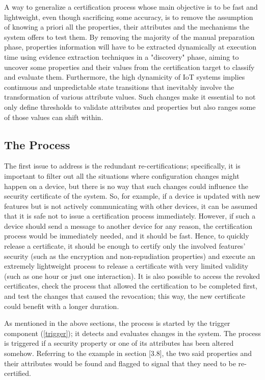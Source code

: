 A way to generalize a certification process whose main objective is to be fast and lightweight, even though sacrificing some accuracy, is to remove the assumption of knowing a priori all the properties, their attributes and the mechanisms the system offers to test them. By removing the majority of the manual preparation phase, properties information will have to be extracted dynamically at execution time using evidence extraction techniques in a "discovery" phase, aiming to uncover some properties and their values from the certification target to classify and evaluate them. Furthermore, the high dynamicity of IoT systems implies continuous and unpredictable state transitions that inevitably involve the transformation of various attribute values. Such changes make it essential to not only define thresholds to validate attributes and properties but also ranges some of those values can shift within.

\subsection{The Process}
The first issue to address is the redundant re-certifications; specifically, it is important to filter out all the situations where configuration changes might happen on a device, but there is no way that such changes could influence the security certificate of the system. So, for example, if a device is updated with new features but is not actively communicating with other devices, it can be assumed that it is safe not to issue a certification process immediately. However, if such a device should send a message to another device for any reason, the certification process would be immediately needed, and it should be fast. Hence, to quickly release a certificate, it should be enough to certify only the involved features' security (such as the encryption and non-repudiation properties) and execute an extremely lightweight process to release a certificate with very limited validity (such as one hour or just one interaction). It is also possible to access the revoked certificates, check the process that allowed the certification to be completed first, and test the changes that caused the revocation; this way, the new certificate could benefit with a longer duration. 

As mentioned in the above sections, the process is started by the trigger component (\ref{trigger}); it detects and evaluates changes in the system. The process is triggered if a security property or one of its attributes has been altered somehow. 
Referring to the example in section [3.8], the two said properties and their attributes would be found and flagged to signal that they need to be re-certified.

